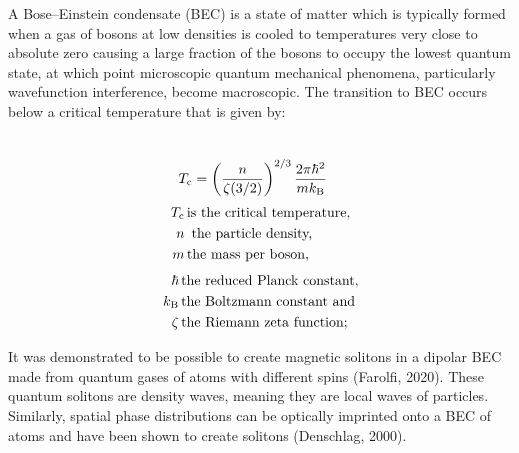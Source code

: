\documentclass{article}
\begin{document}
    A Bose–Einstein condensate (BEC) is a state of matter which is typically formed when a gas of bosons at low densities is cooled to temperatures very close to absolute zero causing a large fraction of the bosons to occupy the lowest quantum state, at which point microscopic quantum mechanical phenomena, particularly wavefunction interference, become macroscopic. The transition to BEC occurs below a critical temperature that is given by:
    \begin{multicols}{3}
    \noindent
    \begin{align*}
        \\
        \displaystyle T_{\rm {c}} &=\left({\frac {n}{\zeta (3/2)}}\right)^{2/3}{\frac {2\pi \hbar ^{2}}{mk_{\rm {B}}}} 
    \end{align*}
    \begin{align*}
        {\displaystyle \,T_{\rm {c}}} \,  &\text{is the critical temperature,}\\
        \displaystyle \,n \, 	 &\text{ the particle density,}\\
        {\displaystyle \,m}	\, &\text{the mass per boson,}
    \end{align*}
    \begin{align*}
        {\displaystyle \hbar } \, 	&\text{the reduced Planck constant,}\\
        {\displaystyle \,k_{\rm {B}}}\, 	&\text{the Boltzmann constant and}\\
        {\displaystyle \,\zeta }\, 	&\text{the Riemann zeta function;}
    \end{align*}
    \end{multicols}
    It was demonstrated to be possible to create magnetic solitons in a dipolar BEC made from quantum gases of atoms with different spins (Farolfi, 2020). These quantum solitons are density waves, meaning they are local waves of particles. Similarly, spatial phase distributions can be optically imprinted onto a BEC of atoms and have been shown to create solitons (Denschlag, 2000). 
    
\end{document}
